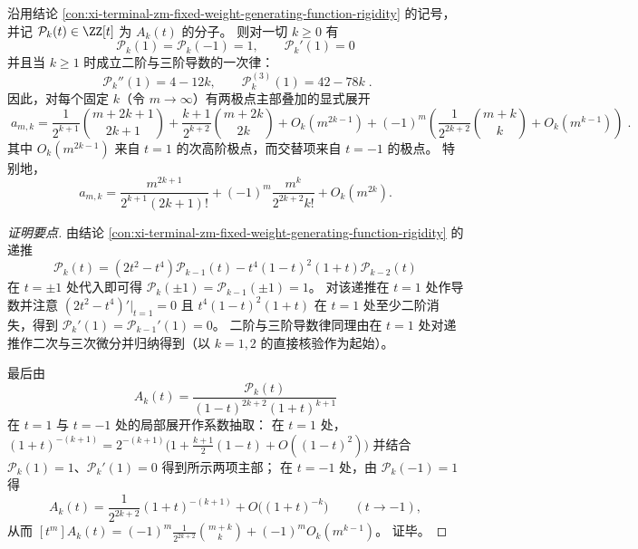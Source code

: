 \begin{conclusion}\label{con:xi-terminal-zm-fixed-weight-two-term-asymptotic}
沿用结论 \ref{con:xi-terminal-zm-fixed-weight-generating-function-rigidity} 的记号，并记 \(\mathcal{P}_k(t)\in\ZZ[t]\) 为 \(A_k(t)\) 的分子。
则对一切 \(k\ge 0\) 有
\[
\boxed{\;
\mathcal{P}_k(1)=\mathcal{P}_k(-1)=1,\qquad \mathcal{P}_k'(1)=0\;}
\]
并且当 \(k\ge 1\) 时成立二阶与三阶导数的一次律：
\[
\boxed{\;
\mathcal{P}_k''(1)=4-12k,\qquad \mathcal{P}_k^{(3)}(1)=42-78k\; }.
\]
因此，对每个固定 \(k\)（令 \(m\to\infty\)）有两极点主部叠加的显式展开
\[
\boxed{\;
a_{m,k}
=\frac{1}{2^{k+1}}\binom{m+2k+1}{2k+1}
+\frac{k+1}{2^{k+2}}\binom{m+2k}{2k}
+O_k(m^{2k-1})
+(-1)^m\left(\frac{1}{2^{2k+2}}\binom{m+k}{k}+O_k(m^{k-1})\right)\; }.
\]
其中 \(O_k(m^{2k-1})\) 来自 \(t=1\) 的次高阶极点，而交替项来自 \(t=-1\) 的极点。
特别地，
\[
a_{m,k}
=\frac{m^{2k+1}}{2^{k+1}(2k+1)!}
+(-1)^m\frac{m^k}{2^{2k+2}k!}
+O_k(m^{2k}).
\]
\end{conclusion}
\begin{proof}[证明要点]
由结论 \ref{con:xi-terminal-zm-fixed-weight-generating-function-rigidity} 的递推
\[
\mathcal{P}_k(t)=(2t^2-t^4)\mathcal{P}_{k-1}(t)-t^4(1-t)^2(1+t)\mathcal{P}_{k-2}(t)
\]
在 \(t=\pm 1\) 处代入即可得 \(\mathcal{P}_k(\pm1)=\mathcal{P}_{k-1}(\pm1)=1\)。
对该递推在 \(t=1\) 处作导数并注意 \((2t^2-t^4)'|_{t=1}=0\) 且 \(t^4(1-t)^2(1+t)\) 在 \(t=1\) 处至少二阶消失，得到 \(\mathcal{P}_k'(1)=\mathcal{P}_{k-1}'(1)=0\)。
二阶与三阶导数律同理由在 \(t=1\) 处对递推作二次与三次微分并归纳得到（以 \(k=1,2\) 的直接核验作为起始）。
\par
最后由
\[
A_k(t)=\frac{\mathcal{P}_k(t)}{(1-t)^{2k+2}(1+t)^{k+1}}
\]
在 \(t=1\) 与 \(t=-1\) 处的局部展开作系数抽取：
在 \(t=1\) 处，
\(
(1+t)^{-(k+1)}=2^{-(k+1)}\bigl(1+\frac{k+1}{2}(1-t)+O((1-t)^2)\bigr)
\)
并结合 \(\mathcal{P}_k(1)=1\)、\(\mathcal{P}_k'(1)=0\) 得到所示两项主部；
在 \(t=-1\) 处，由 \(\mathcal{P}_k(-1)=1\) 得
\[
A_k(t)=\frac{1}{2^{2k+2}}(1+t)^{-(k+1)}+O\!\bigl((1+t)^{-k}\bigr)\qquad(t\to-1),
\]
从而
\(
[t^m]A_k(t)=(-1)^m\frac{1}{2^{2k+2}}\binom{m+k}{k}+(-1)^mO_k(m^{k-1})
\)。
证毕。
\end{proof}

